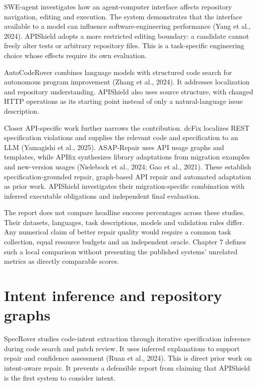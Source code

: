 \documentclass[12pt,a4paper,oneside]{report}
\begin{document}
SWE-agent investigates how an agent-computer interface affects repository navigation, editing and execution. The system demonstrates that the interface available to a model can influence software-engineering performance (Yang et al., 2024). APIShield adopts a more restricted editing boundary: a candidate cannot freely alter tests or arbitrary repository files. This is a task-specific engineering choice whose effects require its own evaluation.

AutoCodeRover combines language models with structured code search for autonomous program improvement (Zhang et al., 2024). It addresses localization and repository understanding. APIShield also uses source structure, with changed HTTP operations as its starting point instead of only a natural-language issue description.

Closer API-specific work further narrows the contribution. dcFix localizes REST specification violations and supplies the relevant code and specification to an LLM (Yamagishi et al., 2025). ASAP-Repair uses API usage graphs and templates, while APIfix synthesizes library adaptations from migration examples and new-version usages (Nielebock et al., 2024; Gao et al., 2021). These establish specification-grounded repair, graph-based API repair and automated adaptation as prior work. APIShield investigates their migration-specific combination with inferred executable obligations and independent final evaluation.

The report does not compare headline success percentages across these studies. Their datasets, languages, task descriptions, models and validation rules differ. Any numerical claim of better repair quality would require a common task collection, equal resource budgets and an independent oracle. Chapter 7 defines such a local comparison without presenting the published systems' unrelated metrics as directly comparable scores.

\section{Intent inference and repository graphs}

SpecRover studies code-intent extraction through iterative specification inference during code search and patch review. It uses inferred explanations to support repair and confidence assessment (Ruan et al., 2024). This is direct prior work on intent-aware repair. It prevents a defensible report from claiming that APIShield is the first system to consider intent.
\end{document}
